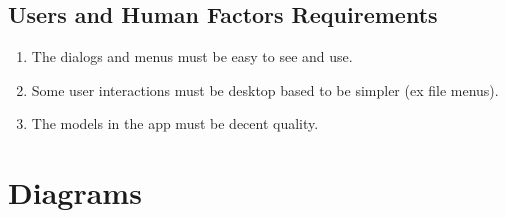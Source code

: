 \documentclass[a4paper,10pt]{article}
\begin{document}
	\subsection{Users and Human Factors Requirements}
	\begin{enumerate}
		\item The dialogs and menus must be easy to see and use.
		\item Some user interactions must be desktop based to be simpler (ex file menus).
		\item The models in the app must be decent quality.
	\end{enumerate}
	
    \pagebreak
    \section{Diagrams}
\end{document}
